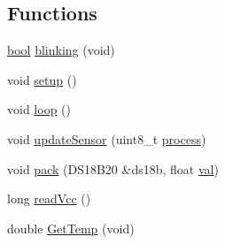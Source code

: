 \subsection*{Functions}
\begin{DoxyCompactItemize}
\item 
\hyperlink{stdbool_8h_abb452686968e48b67397da5f97445f5b}{bool} \hyperlink{OWH__DS18B20__asInterface__SensorStation_8ino_a6766eee584b84ead350781efbabe36d7}{blinking} (void)
\item 
void \hyperlink{OWH__DS18B20__asInterface__SensorStation_8ino_a4fc01d736fe50cf5b977f755b675f11d}{setup} ()
\item 
void \hyperlink{OWH__DS18B20__asInterface__SensorStation_8ino_afe461d27b9c48d5921c00d521181f12f}{loop} ()
\item 
void \hyperlink{OWH__DS18B20__asInterface__SensorStation_8ino_ac39170074503d24a7f72365c7c65b5bf}{update\-Sensor} (uint8\-\_\-t \hyperlink{Yun__Log__BatteryDisCharging_8ino_a2f2962579c73a294710a4407f4d01452}{process})
\item 
void \hyperlink{OWH__DS18B20__asInterface__SensorStation_8ino_a247ef9f9d326cc0fc3bf2cc59e9b9cfb}{pack} (D\-S18\-B20 \&ds18b, float \hyperlink{Uno__Read__CurrentTransformer__SCT__013__030_8ino_aa0ccb5ee6d882ee3605ff47745c6467b}{val})
\item 
long \hyperlink{OWH__DS18B20__asInterface__SensorStation_8ino_a8e23c9421f6663303ea22e4969e2f6c1}{read\-Vcc} ()
\item 
double \hyperlink{OWH__DS18B20__asInterface__SensorStation_8ino_a0a60fd2316c16170dc7aa6aa0f5f485d}{Get\-Temp} (void)
\end{DoxyCompactItemize}
